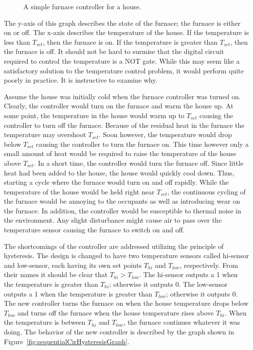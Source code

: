 \begin{figure}[ht]
\caption{A simple furnace controller for a house.}
\label{fig:sequentialCirSimpleFurnace}
\end{figure}

The y-axis of this graph describes the state of the furnace; 
the furnace is either on or off.  The x-axis describes the 
temperature of the house.  
If the temperature is less than $T_{set}$, then the furnace is on.  
If the temperature is greater than $T_{set}$, then the furnace is off.  
It should not be hard to surmise that the digital circuit required to
control the temperature is a NOT gate.  While this may seem like a
satisfactory solution to the temperature control problem, it would
perform quite poorly in practice.  It is instructive to examine why.

Assume the house was initially cold when the
furnace controller was turned on.  Clearly, the controller would turn on the furnace
and warm the house up. At some point, the temperature in the house would
warm up to $T_{set}$ causing the controller to turn off the furnace.  
Because of the residual heat in the furnace the temperature may overshoot 
$T_{set}$.  Soon however, the temperature would drop below $T_{set}$ causing
the controller to turn the furnace on.  This time however only a small amount
of heat would be required to raise the temperature of the house
above $T_{set}$.  In a short time, the controller would turn the furnace off.
Since little heat had been added to the house, the house would quickly cool 
down.  Thus, starting a cycle where the furnace would turn on and off
rapidly. While the temperature of the house would be held right near 
$T_{set}$, the continuous cycling of the furnace would be annoying to 
the occupants as well as introducing wear on the furnace.  In addition, the 
controller would be susceptible to thermal noise in the environment.  Any
slight disturbance might cause air to pass over the temperature
sensor causing the furnace to switch on and off.

The shortcomings of the controller are addressed utilizing the principle
of hysteresis.  The design is changed to have two temperature 
sensors called hi-sensor and low-sensor, each having its own set 
points $T_{hi}$ and
$T_{low}$, respectively. From their names it should be clear that 
$T_{hi} > T_{low}$.
The hi-sensor outputs a 1 when the temperature is greater than
$T_{hi}$; otherwise it outputs 0.
The low-sensor outputs a 1 when the temperature is greater than 
$T_{low}$; otherwise it outputs 0.
The new controller turns the furnace on when the house temperature 
drops below $T_{low}$ and turns off the furnace when the house temperature 
rises above $T_{hi}$.  When the temperature is between $T_{hi}$ and 
$T_{low}$, the furnace continues whatever it was doing.
The behavior of the new controller is described by the graph shown in 
Figure~\ref{fig:sequentialCirHysteresisGraph}.

